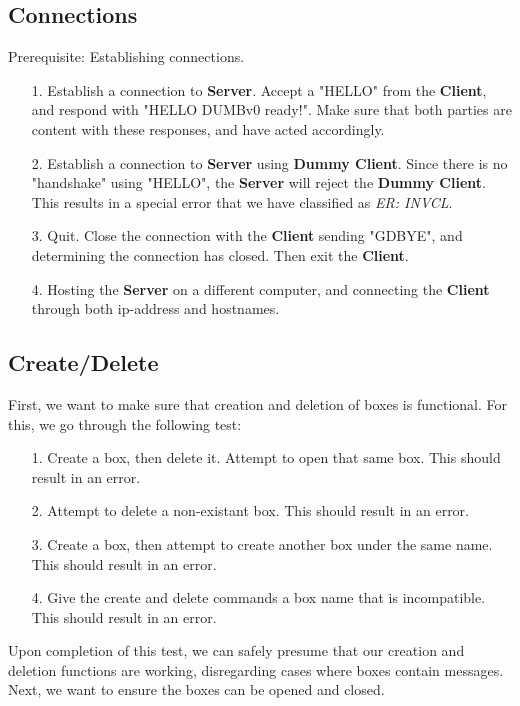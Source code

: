 \documentclass{article}
\begin{document}
        \subsection{Connections}
            Prerequisite: Establishing connections.
            \begin{itemize}
                \item[1.] Establish a connection to \textbf{Server}. Accept a "HELLO" from the \textbf{Client}, and respond with "HELLO DUMBv0 ready!". Make sure that both parties are content with these responses, and have acted accordingly.
                \item[2.] Establish a connection to \textbf{Server} using \textbf{Dummy Client}. Since there is no "handshake" using "HELLO", the \textbf{Server} will reject the \textbf{Dummy Client}. This results in a special error that we have classified as \textit{ER: INVCL}.
                \item[3.] Quit. Close the connection with the \textbf{Client} sending "GDBYE", and determining the connection has closed. Then exit the \textbf{Client}.
                \item[4.] Hosting the \textbf{Server} on a different computer, and connecting the \textbf{Client} through both ip-address and hostnames. 
            \end{itemize}
        \subsection{Create/Delete}
            First, we want to make sure that creation and deletion of boxes is functional. For this, we go through the following test:
            \begin{itemize}
                \item[1.] Create a box, then delete it. Attempt to open that same box. This should result in an error.
                \item[2.] Attempt to delete a non-existant box. This should result in an error.
                \item[3.] Create a box, then attempt to create another box under the same name. This should result in an error.
                \item[4.] Give the create and delete commands a box name that is incompatible. This should result in an error.   
            \end{itemize}
            Upon completion of this test, we can safely presume that our creation and deletion functions are working, disregarding cases where boxes contain messages. Next, we want to ensure the boxes can be opened and closed. 
\end{document}
